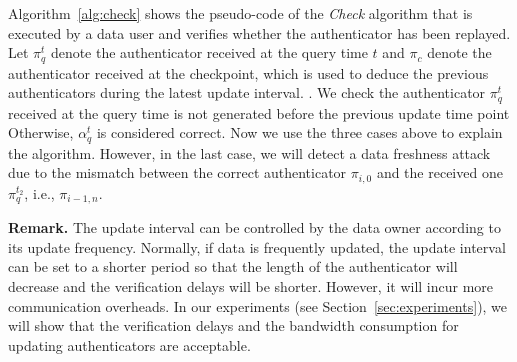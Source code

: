 Algorithm~\ref{alg:check} shows the pseudo-code of the {\it Check} algorithm that is executed by a data user and verifies whether the authenticator has been replayed. Let $\pi^t_q$ denote the authenticator received at the query time $t$ and $\pi_c$ denote the authenticator received at the checkpoint, which is used to deduce the previous authenticators during the latest update interval. . We check the authenticator $\pi^t_q$ received at the query time is not generated before the previous update time point  Otherwise, $\alpha^t_q$ is considered correct. Now we use the three cases above to explain the algorithm.  However, in the last case, we will detect a data freshness attack due to the mismatch between the correct authenticator $\pi_{i, 0}$ and the received one $\pi^{t_2}_q$, i.e., $\pi_{i-1, n}$.

\noindent \textbf{Remark.} The update interval can be controlled by the data owner according to its update frequency. Normally, if data is frequently updated, the update interval can be set to a shorter period so that the length of the authenticator will decrease and the verification delays will be shorter. However, it will incur more communication overheads.
In our experiments (see Section~\ref{sec:experiments}), we will show that the verification delays and the bandwidth consumption for updating authenticators are acceptable.


